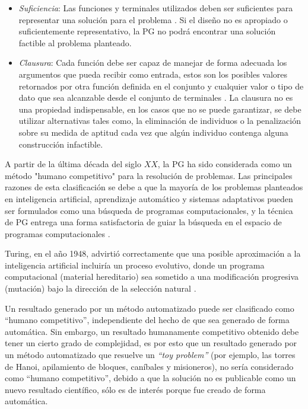 \begin{itemize}


\item \textit{Suficiencia}: Las funciones y terminales utilizados deben ser suficientes para representar una solución para el problema \citep{koza_1992}. Si el diseño no es apropiado o suficientemente representativo, la PG no podrá encontrar una solución factible al problema planteado.

\item \textit{Clausura}: Cada función debe ser capaz de manejar de forma adecuada los argumentos que pueda recibir como entrada, estos son los posibles valores retornados por otra función definida en el conjunto y cualquier valor o tipo de dato que sea alcanzable desde el conjunto de terminales \citep{koza_1992}. La clausura no es una propiedad indispensable, en los casos que no se puede garantizar, se debe utilizar alternativas tales como, la eliminación de individuos o la penalización sobre su medida de aptitud cada vez que algún individuo contenga alguna construcción infactible.


\end{itemize}


A partir de la última década del siglo $XX$, la PG ha sido considerada como un método "humano competitivo" para la resolución de problemas. Las principales razones de esta clasificación se debe a que la mayoría de los problemas planteados en inteligencia artificial, aprendizaje automático y sistemas adaptativos pueden ser formulados como una búsqueda de programas computacionales, y la técnica de PG entrega una forma satisfactoria de guiar la búsqueda en el espacio de programas computacionales \citep{affenzeller_2001}.

Turing, en el año 1948, advirtió correctamente que una posible aproximación a la inteligencia artificial incluiría un proceso evolutivo, donde un programa computacional (material hereditario) sea sometido a una modificación progresiva (mutación) bajo la dirección de la selección natural \citep{koza_poli_2005}.

Un resultado generado por un método automatizado puede ser clasificado como “humano competitivo”, independiente del hecho de que sea generado de forma automática. Sin embargo, un resultado humanamente competitivo obtenido debe tener un cierto grado de complejidad, es por esto que un resultado generado por un método automatizado que resuelve un \textit{“toy problem”} (por ejemplo, las torres de Hanoi, apilamiento de bloques, caníbales y misioneros), no sería considerado como “humano competitivo”, debido a que la solución no es publicable como un nuevo resultado científico, sólo es de interés porque fue creado de forma automática.

